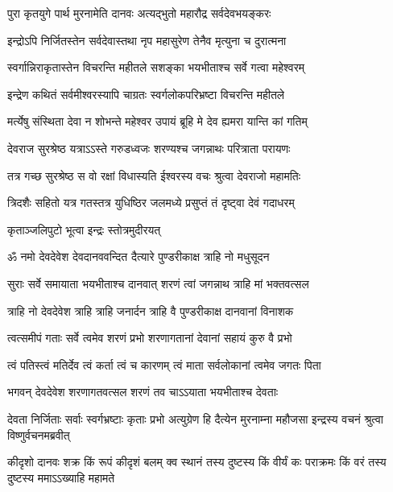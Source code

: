 \twolineshloka
{पुरा कृतयुगे पार्थ मुरनामेति दानवः}
{अत्यद्भुतो महारौद्र सर्वदेवभयङ्करः}%

\twolineshloka
{इन्द्रोऽपि निर्जितस्तेन सर्वदेवास्तथा नृप}
{महासुरेण तेनैव मृत्युना च दुरात्मना}%

\twolineshloka
{स्वर्गान्निराकृतास्तेन विचरन्ति महीतले}
{सशङ्का भयभीताश्च सर्वे गत्वा महेश्वरम्}%

\twolineshloka
{इन्द्रेण कथितं सर्वमीश्वरस्यापि चाग्रतः}
{स्वर्गलोकपरिभ्रष्टा विचरन्ति  महीतले}%

\twolineshloka
{मर्त्येषु संस्थिता देवा न शोभन्ते महेश्वर}
{उपायं ब्रूहि मे देव ह्यमरा यान्ति कां गतिम्}%


\twolineshloka
{देवराज सुरश्रेष्ठ यत्राऽऽस्ते गरुडध्वजः}
{शरण्यश्च जगन्नाथः परित्राता परायणः}%

\twolineshloka
{तत्र गच्छ सुरश्रेष्ठ स वो रक्षां विधास्यति}
{ईश्वरस्य वचः श्रुत्वा देवराजो महामतिः}%

\twolineshloka
{त्रिदशैः सहितो यत्र गतस्तत्र युधिष्ठिर}
{जलमध्ये प्रसुप्तं तं दृष्ट्वा देवं गदाधरम्}%

\onelineshloka
{कृताञ्जलिपुटो भूत्वा इन्द्रः स्तोत्रमुदीरयत्}%


\twolineshloka
{ॐ नमो देवदेवेश देवदानववन्दित}
{दैत्यारे पुण्डरीकाक्ष त्राहि नो मधुसूदन}%

\twolineshloka
{सुराः सर्वे समायाता भयभीताश्च दानवात्}
{शरणं त्वां जगन्नाथ त्राहि मां भक्तवत्सल}%

\twolineshloka
{त्राहि नो देवदेवेश त्राहि त्राहि जनार्दन}
{त्राहि वै पुण्डरीकाक्ष दानवानां विनाशक}%

\twolineshloka
{त्वत्समीपं गताः सर्वे त्वमेव शरणं प्रभो}
{शरणागतानां देवानां सहायं कुरु वै प्रभो}%

\twolineshloka
{त्वं पतिस्त्वं मतिर्देव त्वं कर्ता त्वं च कारणम्}
{त्वं माता सर्वलोकानां त्वमेव जगतः पिता}%

\twolineshloka
{भगवन् देवदेवेश शरणागतवत्सल}
{शरणं तव चाऽऽयाता भयभीताश्च देवताः}%


\threelineshloka
{देवता निर्जिताः सर्वाः स्वर्गभ्रष्टाः कृताः प्रभो}
{अत्युग्रेण हि दैत्येन मुरनाम्ना महौजसा}
{इन्द्रस्य वचनं श्रुत्वा विष्णुर्वचनमब्रवीत्}%


\threelineshloka
{कीदृशो दानवः शक्र किं रूपं कीदृशं बलम्}
{क्व स्थानं तस्य दुष्टस्य किं वीर्यं कः पराक्रमः}
{किं वरं तस्य दुष्टस्य ममाऽऽख्याहि महामते}%

